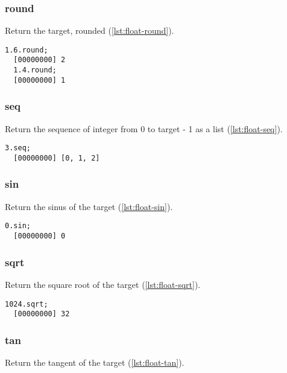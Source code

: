 \subsubsection{round}

Return the target, rounded (\autoref{lst:float-round}).

\begin{lstlisting}[caption=Float.round, label=lst:float-round,
  float=\floatposh]
  1.6.round;
  [00000000] 2
  1.4.round;
  [00000000] 1
\end{lstlisting}

\subsubsection{seq}

Return the sequence of integer from 0 to target - 1 as a list (\autoref{lst:float-seq}).

\begin{lstlisting}[caption=Float.seq, label=lst:float-seq,
  float=\floatposh]
  3.seq;
  [00000000] [0, 1, 2]
\end{lstlisting}

\subsubsection{sin}

Return the sinus of the target (\autoref{lst:float-sin}).

\begin{lstlisting}[caption=Float.sin, label=lst:float-sin,
  float=\floatposh]
  0.sin;
  [00000000] 0
\end{lstlisting}

\subsubsection{sqrt}

Return the square root of the target (\autoref{lst:float-sqrt}).

\begin{lstlisting}[caption=Float.sqrt, label=lst:float-sqrt,
  float=\floatposh]
  1024.sqrt;
  [00000000] 32
\end{lstlisting}

\subsubsection{tan}

Return the tangent of the target (\autoref{lst:float-tan}).


